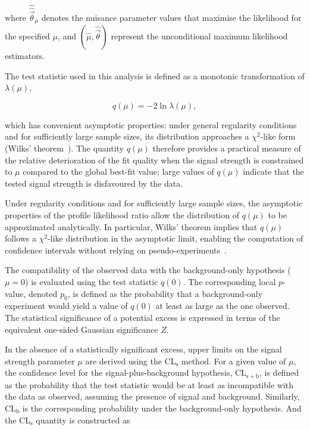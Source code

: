 where $\hat{\hat{\vec{\theta}}}_\mu$ denotes the nuisance parameter values that maximise the likelihood for the specified $\mu$, and $(\hat{\mu},\hat{\vec{\theta}})$ represent the unconditional maximum likelihood estimators.

The test statistic used in this analysis is defined as a monotonic transformation of $\lambda(\mu)$,

\begin{equation}
q(\mu) = -2 \ln \lambda(\mu),
\end{equation}

which has convenient asymptotic properties: under general regularity conditions and for sufficiently large sample sizes, its distribution approaches a $\chi^2$-like form (Wilks' theorem~\cite{Wilks1938}).
The quantity $q(\mu)$ therefore provides a practical measure of the relative deterioration of the fit quality when the signal strength is constrained to $\mu$ compared to the global best-fit value; large values of $q(\mu)$ indicate that the tested signal strength is disfavoured by the data.

Under regularity conditions and for sufficiently large sample sizes, the asymptotic properties of the profile likelihood ratio allow the distribution of $q(\mu)$ to be approximated analytically. 
In particular, Wilks' theorem implies that $q(\mu)$ follows a $\chi^2$-like distribution in the asymptotic limit, enabling the computation of confidence intervals without relying on pseudo-experiments~\cite{Wilks1938}. 

The compatibility of the observed data with the background-only hypothesis ($\mu=0$) is evaluated using the test statistic $q(0)$. 
The corresponding local $p$-value, denoted $p_0$, is defined as the probability that a background-only experiment would yield a value of $q(0)$ at least as large as the one observed. 
The statistical significance of a potential excess is expressed in terms of the equivalent one-sided Gaussian significance $Z$.

In the absence of a statistically significant excess, upper limits on the signal strength parameter $\mu$ are derived using the CL$_\mathrm{s}$ method. 
For a given value of $\mu$, the confidence level for the signal-plus-background hypothesis, $\mathrm{CL}_{\mathrm{s+b}}$, is defined as the probability that the test statistic would be at least as incompatible with the data as observed, assuming the presence of signal and background. 
Similarly, $\mathrm{CL}_{\mathrm{b}}$ is the corresponding probability under the background-only hypothesis.
And the CL$_\mathrm{s}$ quantity is constructed as

